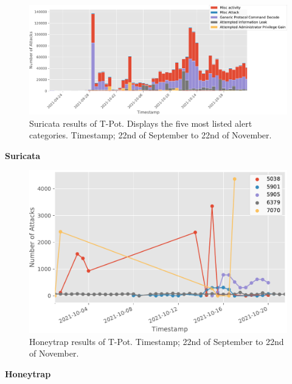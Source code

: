 \begin{figure}[ht]
    \centering
    \includegraphics[width=\textwidth]{figures/tpot-suricata-alerts.pdf}
    \caption[Suricata results of T-Pot]{Suricata results of T-Pot. Displays the five most listed alert categories. Timestamp; 22nd of September to 22nd of November.}
    \label{fig:suricata-results}
\end{figure}

\textbf{Suricata}

\begin{figure}[ht]
    \centering
    \includegraphics[width=\textwidth]{figures/tpot-honeytrap-port.pdf}
    \caption[Honeytrap results of T-Pot]{Honeytrap results of T-Pot. Timestamp; 22nd of September to 22nd of November.}
    \label{fig:honeytrap-results}
\end{figure}

\textbf{Honeytrap}

